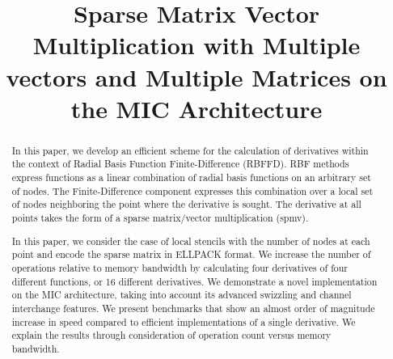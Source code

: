 \documentclass[10pt,conference,compsocconf]{IEEEtran}
\begin{document}
\title{Sparse Matrix Vector Multiplication with Multiple vectors and
  Multiple Matrices on the MIC Architecture}


\author{
}
\maketitle


\begin{abstract}
In this paper, we develop an efficient scheme for the calculation of
derivatives within the context of Radial Basis Function
Finite-Difference (RBFFD). RBF methods express functions as a linear
combination of radial basis functions on an arbitrary set of
nodes. The Finite-Difference component expresses this combination over
a local set of nodes neighboring the point where the derivative is
sought.  The derivative at all points takes the form of a sparse
matrix/vector multiplication (spmv).

In this paper, we consider the case of local stencils with the number
of nodes at each point and encode the sparse matrix in ELLPACK
format. We increase the number of operations relative to memory
bandwidth by calculating four derivatives of four different functions,
or 16 different derivatives. We demonstrate a novel implementation on
the MIC architecture, taking into account its advanced swizzling and
channel interchange features. We present benchmarks that show an
almost order of magnitude increase in speed compared to efficient
implementations of a single derivative. We explain the results through
consideration of operation count versus memory bandwidth.
\end{abstract}
\end{document}
